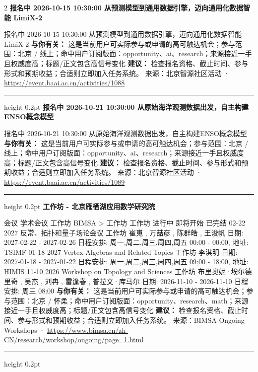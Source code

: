 \documentclass[10.5pt]{ctexart}
\begin{document}
\begin{multicols}{2}
{\large\bfseries 报名中 2026-10-15 10:30:00 从预测模型到通用数据引擎，迈向通用化数据智能 LimiX-2}\par
报名中 2026-10-15 10:30:00 从预测模型到通用数据引擎，迈向通用化数据智能 LimiX-2
\textbf{与你有关：} 这是当前用户可实际参与或申请的高可触达机会；参与范围：北京 / 线上；命中用户订阅版面：opportunity、ai、research；来源接近一手且权威度高；标题/正文包含高信号变化
\textbf{建议：} 检查报名资格、截止时间、参与形式和预期收益；合适则立即加入任务系统。
{\footnotesize\color{ormuted} 来源：北京智源社区活动 · \url{https://event.baai.ac.cn/activities/1088}}
\vspace{2mm}
\hrule height 0.2pt
\vspace{2mm}
{\large\bfseries 报名中 2026-10-21 10:30:00 从原始海‮观洋‬测数据出发，自主构建ENSO概念模型}\par
报名中 2026-10-21 10:30:00 从原始海‮观洋‬测数据出发，自主构建ENSO概念模型
\textbf{与你有关：} 这是当前用户可实际参与或申请的高可触达机会；参与范围：北京 / 线上；命中用户订阅版面：opportunity、ai、research；来源接近一手且权威度高；标题/正文包含高信号变化
\textbf{建议：} 检查报名资格、截止时间、参与形式和预期收益；合适则立即加入任务系统。
{\footnotesize\color{ormuted} 来源：北京智源社区活动 · \url{https://event.baai.ac.cn/activities/1089}}
\vspace{2mm}
\hrule height 0.2pt
\vspace{2mm}
{\large\bfseries 工作坊 - 北京雁栖湖应用数学研究院}\par
会议 学术会议 工作坊 BIMSA > 工作坊 工作坊 进行中 即将开始 已完结 02-22 2027 反常、拓扑和量子场论会议 工作坊 崔嵬 , 万喆彦 , 陈群皓 , 王浚帆 日期: 2027-02-22 - 2027-02-26 日程安排: 周一,周二,周三,周四,周五 00:00 - 00:00, 地址: TSIMF 01-18 2027 Vertex Algebras and Related Topics 工作坊 李淇明 日期: 2027-01-18 - 2027-01-22 日程安排: 周一,周二,周三,周四,周五 09:00 - 18:00, 地址: HIMIS 11-10 2026 Workshop on Topology and Sciences 工作坊 布里奥妮·埃尔德里奇 , 吴杰 , 刘冉 , 雷逢春 , 普拉文·库马尔 日期: 2026-11-10 - 2026-11-10 日程安排: 周三 08:00
\textbf{与你有关：} 这是当前用户可实际参与或申请的高可触达机会；参与范围：北京 / 怀柔；命中用户订阅版面：opportunity、research、math；来源接近一手且权威度高；标题/正文包含高信号变化
\textbf{建议：} 检查报名资格、截止时间、参与形式和预期收益；合适则立即加入任务系统。
{\footnotesize\color{ormuted} 来源：BIMSA Ongoing Workshops · \url{https://www.bimsa.cn/zh-CN/research/workshop/ongoing/page_1.html}}
\vspace{2mm}
\hrule height 0.2pt
\vspace{2mm}

\end{multicols}
\end{document}
